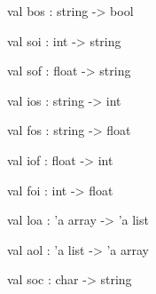 \documentclass[11pt]{article}
\begin{document}
\label{val:Util.bos}\begin{ocamldoccode}
val bos : string -> bool
\end{ocamldoccode}




\label{val:Util.soi}\begin{ocamldoccode}
val soi : int -> string
\end{ocamldoccode}




\label{val:Util.sof}\begin{ocamldoccode}
val sof : float -> string
\end{ocamldoccode}




\label{val:Util.ios}\begin{ocamldoccode}
val ios : string -> int
\end{ocamldoccode}




\label{val:Util.fos}\begin{ocamldoccode}
val fos : string -> float
\end{ocamldoccode}




\label{val:Util.iof}\begin{ocamldoccode}
val iof : float -> int
\end{ocamldoccode}




\label{val:Util.foi}\begin{ocamldoccode}
val foi : int -> float
\end{ocamldoccode}




\label{val:Util.loa}\begin{ocamldoccode}
val loa : 'a array -> 'a list
\end{ocamldoccode}




\label{val:Util.aol}\begin{ocamldoccode}
val aol : 'a list -> 'a array
\end{ocamldoccode}




\label{val:Util.soc}\begin{ocamldoccode}
val soc : char -> string
\end{ocamldoccode}
\end{document}
